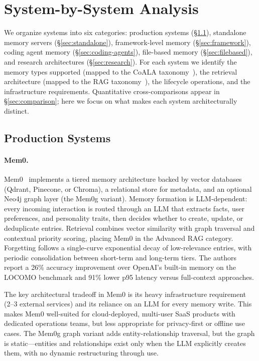 \section{System-by-System Analysis}
\label{sec:systems}

We organize systems into six categories: production systems
(\S\ref{sec:production}), standalone memory servers
(\S\ref{sec:standalone}), framework-level memory
(\S\ref{sec:framework}), coding agent memory (\S\ref{sec:coding-agents}),
file-based memory (\S\ref{sec:filebased}), and research architectures
(\S\ref{sec:research}). For each system we identify the memory
types supported (mapped to the CoALA taxonomy~\cite{sumers2024coala}),
the retrieval architecture (mapped to the RAG
taxonomy~\cite{gao2023rag}), the lifecycle operations, and the
infrastructure requirements. Quantitative cross-comparisons appear in
\S\ref{sec:comparison}; here we focus on what makes each system
architecturally distinct.

\subsection{Production Systems}
\label{sec:production}

\paragraph{Mem0.}
Mem0~\cite{choudhary2025mem0} implements a tiered memory architecture
backed by vector databases (Qdrant, Pinecone, or Chroma), a relational
store for metadata, and an optional Neo4j graph layer (the Mem0g
variant). Memory formation is LLM-dependent: every incoming
interaction is routed through an LLM that extracts facts, user
preferences, and personality traits, then decides whether to create,
update, or deduplicate entries. Retrieval combines vector similarity
with graph traversal and contextual priority scoring, placing Mem0 in
the Advanced RAG category. Forgetting follows a single-curve
exponential decay of low-relevance entries, with periodic consolidation
between short-term and long-term tiers. The authors report a 26\%
accuracy improvement over OpenAI's built-in memory on the LOCOMO
benchmark and 91\% lower p95 latency versus full-context approaches.

The key architectural tradeoff in Mem0 is its heavy infrastructure
requirement (2--3 external services) and its reliance on an LLM for
every memory write. This makes Mem0 well-suited for cloud-deployed,
multi-user SaaS products with dedicated operations teams, but less
appropriate for privacy-first or offline use cases. The Mem0g graph
variant adds entity-relationship traversal, but the graph is
static---entities and relationships exist only when the LLM explicitly
creates them, with no dynamic restructuring through use.

